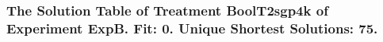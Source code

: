  \begin{frame}
 \fontsize{8pt}{9pt}\selectfont
 \frametitle{ The Solution Table of Treatment BoolT2sgp4k of Experiment ExpB. Fit: 0. Unique Shortest Solutions: 75. }

 \label{ExpBSolutionTable012.tex}  
 \end{frame}

